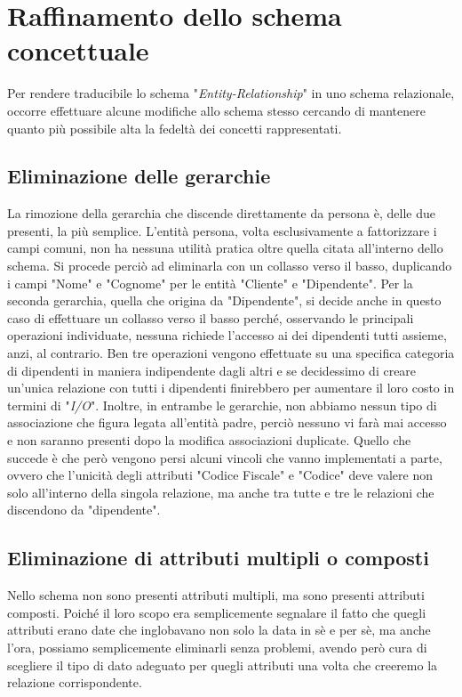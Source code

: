 \documentclass[a4paper, 12pt]{report}
\begin{document}
\section{Raffinamento dello schema concettuale}

Per rendere traducibile lo schema "\textit{Entity-Relationship}" in uno schema relazionale, occorre effettuare alcune modifiche allo schema stesso
cercando di mantenere quanto più possibile alta la fedeltà dei concetti rappresentati.

\subsection{Eliminazione delle gerarchie}

La rimozione della gerarchia che discende direttamente da persona è, delle due presenti, la più semplice. L'entità persona, volta esclusivamente a fattorizzare
i campi comuni, non ha nessuna utilità pratica oltre quella citata all'interno dello schema. Si procede perciò ad eliminarla con un collasso verso il basso,
duplicando i campi "Nome" e "Cognome" per le entità "Cliente" e "Dipendente". Per la seconda gerarchia, quella che origina da "Dipendente", si decide anche in questo
caso di effettuare un collasso verso il basso perché, osservando le principali operazioni individuate, nessuna richiede l'accesso ai dei dipendenti tutti assieme,
anzi, al contrario. Ben tre operazioni vengono effettuate su una specifica categoria di dipendenti in maniera indipendente dagli altri e se decidessimo di creare un'unica
relazione con tutti i dipendenti finirebbero per aumentare il loro costo in termini di "\textit{I/O}". Inoltre, in entrambe le gerarchie, non abbiamo nessun tipo di associazione
che figura legata all'entità padre, perciò nessuno vi farà mai accesso e non saranno presenti dopo la modifica associazioni duplicate. Quello che succede è che però
vengono persi alcuni vincoli che vanno implementati a parte, ovvero che l'unicità degli attributi "Codice Fiscale" e "Codice" deve valere non solo all'interno della singola
relazione, ma anche tra tutte e tre le relazioni che discendono da "dipendente".

\subsection{Eliminazione di attributi multipli o composti}

Nello schema non sono presenti attributi multipli, ma sono presenti attributi composti. Poiché il loro scopo era semplicemente segnalare il fatto che quegli attributi erano date
che inglobavano non solo la data in sè e per sè, ma anche l'ora, possiamo semplicemente eliminarli senza problemi, avendo però cura di scegliere il tipo di dato adeguato
per quegli attributi una volta che creeremo la relazione corrispondente.
\end{document}

